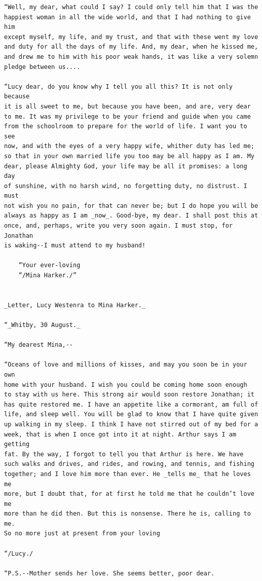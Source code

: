 \documentclass{article}
\begin{document}
\begin{verbatim}
“Well, my dear, what could I say? I could only tell him that I was the
happiest woman in all the wide world, and that I had nothing to give him
except myself, my life, and my trust, and that with these went my love
and duty for all the days of my life. And, my dear, when he kissed me,
and drew me to him with his poor weak hands, it was like a very solemn
pledge between us....

“Lucy dear, do you know why I tell you all this? It is not only because
it is all sweet to me, but because you have been, and are, very dear
to me. It was my privilege to be your friend and guide when you came
from the schoolroom to prepare for the world of life. I want you to see
now, and with the eyes of a very happy wife, whither duty has led me;
so that in your own married life you too may be all happy as I am. My
dear, please Almighty God, your life may be all it promises: a long day
of sunshine, with no harsh wind, no forgetting duty, no distrust. I must
not wish you no pain, for that can never be; but I do hope you will be
always as happy as I am _now_. Good-bye, my dear. I shall post this at
once, and, perhaps, write you very soon again. I must stop, for Jonathan
is waking--I must attend to my husband!

    “Your ever-loving
    “/Mina Harker./”


_Letter, Lucy Westenra to Mina Harker._

“_Whitby, 30 August._

“My dearest Mina,--

“Oceans of love and millions of kisses, and may you soon be in your own
home with your husband. I wish you could be coming home soon enough
to stay with us here. This strong air would soon restore Jonathan; it
has quite restored me. I have an appetite like a cormorant, am full of
life, and sleep well. You will be glad to know that I have quite given
up walking in my sleep. I think I have not stirred out of my bed for a
week, that is when I once got into it at night. Arthur says I am getting
fat. By the way, I forgot to tell you that Arthur is here. We have
such walks and drives, and rides, and rowing, and tennis, and fishing
together; and I love him more than ever. He _tells me_ that he loves me
more, but I doubt that, for at first he told me that he couldn’t love me
more than he did then. But this is nonsense. There he is, calling to me.
So no more just at present from your loving

“/Lucy./

“P.S.--Mother sends her love. She seems better, poor dear.


\end{verbatim}
\end{document}
